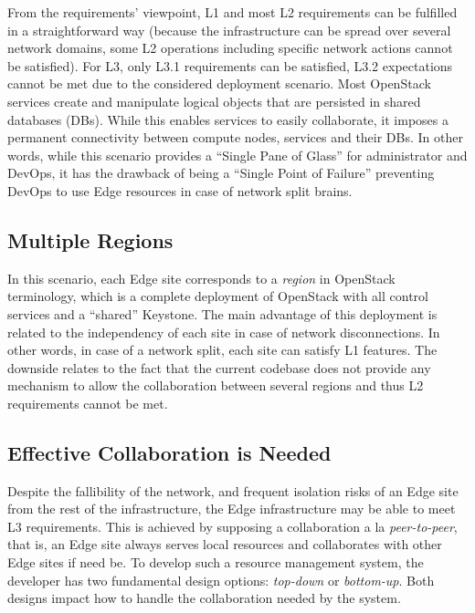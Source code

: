 From the requirements' viewpoint, L1 and most L2 requirements can be
fulfilled in a straightforward way (because the infrastructure can be
spread over several network domains, some L2 operations including
specific network actions cannot be satisfied).  For L3, only L3.1
requirements can be satisfied, L3.2 expectations cannot be met due to
the considered deployment scenario. Most OpenStack services create and
manipulate logical objects that are persisted in shared databases
(DBs).  While this enables services to easily collaborate, it imposes
a permanent connectivity between compute nodes, services and their
DBs.  In other words, while this scenario provides a ``Single Pane of
Glass'' for administrator and DevOps, it has the drawback of being a
``Single Point of Failure'' preventing DevOps to use Edge resources in
case of network split brains.

\subsection{Multiple Regions}
In this scenario, each Edge site corresponds to a \emph{region}
in OpenStack terminology, which is a complete deployment of
OpenStack with all control services and a ``shared'' Keystone.
The main advantage of this deployment is related to the independency
of each site in case of network disconnections. In other words, in
case of a network split, each site can satisfy L1 features. The
downside relates to the fact that the current codebase does not
provide any mechanism to allow the collaboration between several
regions and thus L2 requirements cannot be met.~


\subsection{Effective Collaboration is Needed}
Despite the fallibility of the network, and frequent isolation risks
of an Edge site from the rest of the infrastructure, the Edge
infrastructure may be able to meet L3 requirements. This
is achieved by supposing a collaboration a la \emph{peer-to-peer},
that is, an Edge site always serves local resources and collaborates
with other Edge sites if need be. To develop such a resource
management system, the developer has two fundamental design options:
\emph{top-down} or \emph{bottom-up}. Both designs impact how to handle
the collaboration needed by the system.

